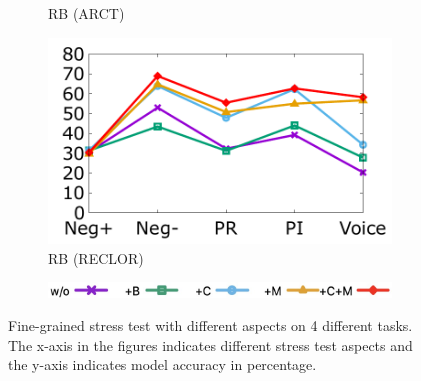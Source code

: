 \begin{figure}[!th]
\begin{subfigure}[b]{0.23\textwidth}
\caption{RB (ARCT)}
\label{fig:arct_roberta}
\end{subfigure}
\hfill
\begin{subfigure}[b]{0.23\textwidth}
\centering
\includegraphics[width=\columnwidth]{data/reclor_roberta.pdf}
\caption{RB (RECLOR)}
\label{fig:arct_roberta}
\end{subfigure}
\newpage
\begin{subfigure}[b]{1.0\textwidth}
\centering
\includegraphics[width=0.4\columnwidth]{data/label.jpg}
\label{fig:label}
\end{subfigure}
\caption{Fine-grained stress test with different aspects on 4 different tasks. 
The x-axis in the figures indicates different stress test aspects and the y-axis indicates model accuracy in percentage.}
\label{fig:detail}
\end{figure}

